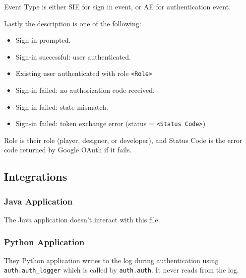 \documentclass[11pt]{article}
\begin{document}
Event Type is either SIE for sign in event, or AE for authentication event.

Lastly the description is one of the following:
\begin{itemize}
  \item Sign-in prompted.
  \item Sign-in successful: user authenticated.
  \item Existing user authenticated with role \verb|<Role>|
  \item Sign-in failed: no authorization code received.
  \item Sign-in failed: state mismatch.
  \item Sign-in failed: token exchange error (status = \verb|<Status Code>|)
\end{itemize}

Role is their role (player, designer, or developer), and Status Code is the error code returned by Google OAuth if it fails.
\subsection{Integrations}
\subsubsection{Java Application}
The Java application doesn't interact with this file.
\subsubsection{Python Application}
They Python application writes to the log during authentication using \verb|auth.auth_logger| which is called by \verb|auth.auth|. It never reads from the log.
\end{document}

